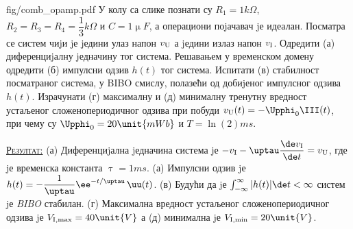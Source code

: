 \begin{slikaDesno}{fig/comb_opamp.pdf}
    \PID 
У колу са слике познати су $R_1 = 1\unit{k\Omega}$, 
$R_2 = R_3 = R_4 = \dfrac{1}{3}\unit{k\Omega}$ и 
$C = 1\unit{\upmu F}$, а
операциони поjачавач jе идеалан. 
Посматра се систем чиjи jе jедини улаз напон
$v_{\rm U}$ а jедини излаз напон $v_{\rm I}$. 
Одредити 
(а) диференциjалну jедначину тог система. Решавањем у временском домену одредити 
(б) импулсни одзив $h(t)$
тог система. Испитати (в) стабилност посматраног система, у BIBO смислу,
полазећи од добиjеног импулсног одзива $h(t)$. 
Израчунати (г) максималну
и (д) минималну тренутну вредност устаљеног сложенопериодичног одзива
при побуди 
$v_{\rm U} (t) = -\Upphi_0 \III(t)$, 
при чему су $\Upphi_0 = 20\unit{mWb}$ и $T = \ln(2)\unit{ms}$.
\end{slikaDesno}
\vspace*{2mm}

\textsc{\underline{Резултат:}}
(а) Диференциjална jедначина система jе 
$-v_{\rm I} - \uptau \dfrac{\de v_{\rm I}}{\de t} = v_{\rm U}$, где jе временска константа 
$\uptau = 1\unit{ms}$. 
(а) Импулсни одзив jе $h(t) = -\dfrac{1}{\uptau} \ee^{-t/\uptau}\,\uu(t)$. 
(в) Будући да jе 
$ \int_{-\infty}^{\infty} |h(t)| \de t < \infty$
систем jе \textit{BIBO} стабилан. 
(г) Максимална вредност устаљеног сложенопериодичног одзива jе 
$V_{\rm I,max} = 40\unit{V}$ а (д) 
минимална jе $V_{\rm I,min} = 20\unit{V}$.